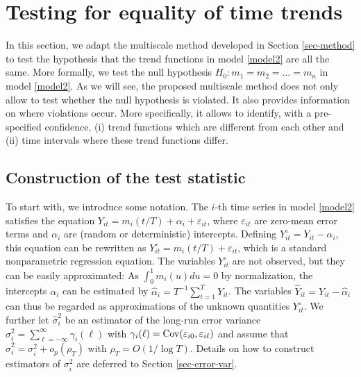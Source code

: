 \section{Testing for equality of time trends}\label{sec-test-equality}


In this section, we adapt the multiscale method developed in Section \ref{sec-method} to test the hypothesis that the trend functions in model \eqref{model2} are all the same. More formally, we test the null hypothesis $H_0: m_1 = m_2 = \ldots = m_n$ in model \eqref{model2}. As we will see, the proposed multiscale method does not only allow to test whether the null hypothesis is violated. It also provides information on where violations occur. More specifically, it allows to identify, with a pre-specified confidence, (i) trend functions which are different from each other and (ii) time intervals where these trend functions differ.


\subsection{Construction of the test statistic}\label{subsec-test-equality-stat}


To start with, we introduce some notation. The $i$-th time series in model \eqref{model2} satisfies the equation $Y_{it} = m_i(t/T) + \alpha_i + \varepsilon_{it}$, where $\varepsilon_{it}$ are zero-mean error terms and $\alpha_i$ are (random or deterministic) intercepts. Defining $Y_{it}^\circ = Y_{it} - \alpha_i$, this equation can be rewritten as $Y_{it}^\circ = m_i(t/T) + \varepsilon_{it}$, which is a standard nonparametric regression equation. The variables $Y_{it}^\circ$ are not observed, but they can be easily approximated: As $\int_0^1 m_i(u) du = 0$ by normalization, the intercepts $\alpha_i$ can be estimated by $\widehat{\alpha}_i = T^{-1} \sum_{t=1}^T Y_{it}$. The variables $\widehat{Y}_{it} = Y_{it} - \widehat{\alpha}_i$ can thus be regarded as approximations of the unknown quantities $Y_{it}^\circ$. We further let $\widehat{\sigma}_i^2$ be an estimator of the long-run error variance $\sigma_i^2 = \sum\nolimits_{\ell=-\infty}^{\infty} \gamma_i(\ell)$ with $\gamma_i(\ell) = \textnormal{Cov}(\varepsilon_{i0}, \varepsilon_{i\ell})$ and assume that $\widehat{\sigma}_i^2 = \sigma_i^2 + o_p(\rho_T)$ with $\rho_T = O(1/\log T)$. Details on how to construct estimators of $\sigma_i^2$ are deferred to Section \ref{sec-error-var}. 


